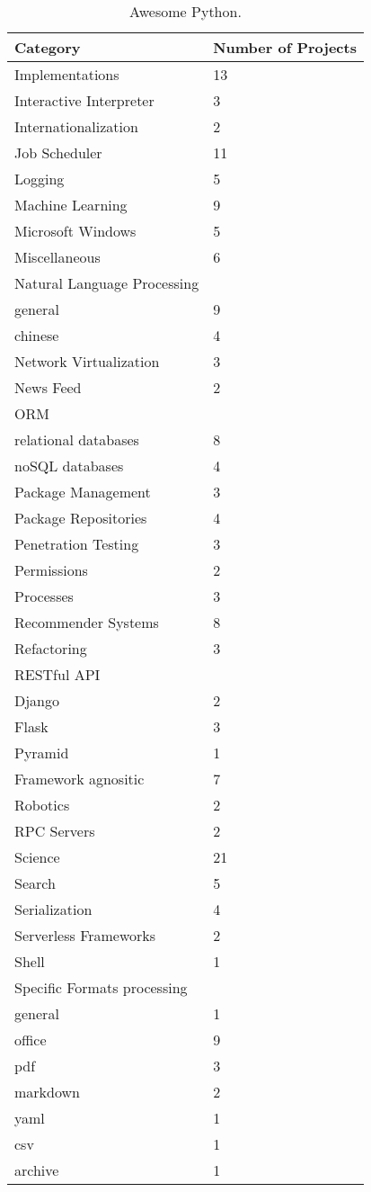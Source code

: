 \begin{table}[ht]
\centering
\begin{tabular}{ll}
\hline
\textbf{Category} & \textbf{Number of Projects}\\
\hline
Implementations & 13\\
Interactive Interpreter & 3\\
Internationalization & 2\\
Job Scheduler & 11\\
Logging & 5\\
Machine Learning & 9\\
Microsoft Windows & 5\\
Miscellaneous & 6\\
Natural Language Processing & \\
general & 9\\
chinese & 4\\
Network Virtualization & 3\\
News Feed & 2\\
ORM & \\
relational databases & 8\\
noSQL databases & 4\\
Package Management & 3\\
Package Repositories & 4\\
Penetration Testing & 3\\
Permissions & 2\\
Processes & 3\\
Recommender Systems & 8\\
Refactoring & 3\\
RESTful API & \\
Django & 2\\
Flask & 3\\
Pyramid & 1\\
Framework agnositic & 7\\
Robotics & 2\\
RPC Servers & 2\\
Science & 21\\
Search & 5\\
Serialization & 4\\
Serverless Frameworks & 2\\
Shell & 1\\
Specific Formats processing & \\
general & 1\\
office & 9\\
pdf & 3\\
markdown & 2\\
yaml & 1\\
csv & 1\\
archive & 1\\
\hline
\end{tabular}
\caption[Awesome Python]{\label{table:awesome-python3}Awesome Python.}
\end{table}

